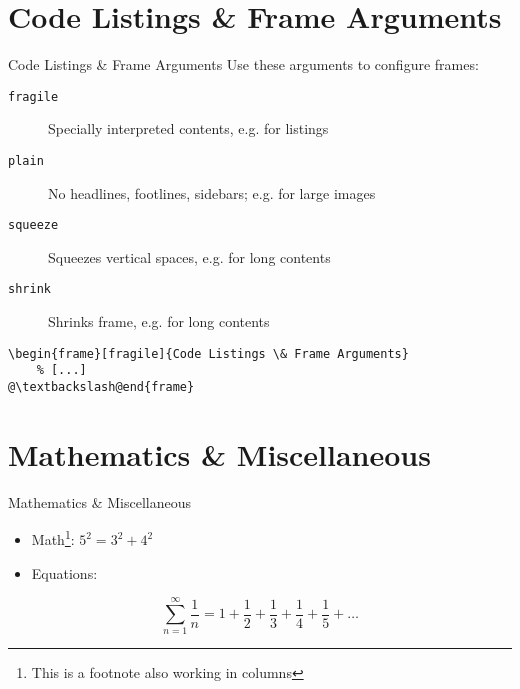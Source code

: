 \documentclass{beamer}
\begin{document}
\section{Code Listings \& Frame Arguments}
\begin{frame}[fragile]{Code Listings \& Frame Arguments}
	Use these arguments to configure frames:
	\begin{description}
		\item[\texttt{fragile}\hfill]
		Specially interpreted contents, e.g. for listings
		\item[\texttt{plain}\hfill]
		No headlines, footlines, sidebars; e.g. for large images\\
		\item[\texttt{squeeze}\hfill]
		Squeezes vertical spaces, e.g. for long contents
		\item[\texttt{shrink}\hfill]
		Shrinks frame, e.g. for long contents
	\end{description}
	\begin{lstlisting}[caption={Frame Options}]
\begin{frame}[fragile]{Code Listings \& Frame Arguments}
	% [...]
@\textbackslash@end{frame}
	\end{lstlisting}
\end{frame}

\section{Mathematics \& Miscellaneous}
\begin{frame}{Mathematics \& Miscellaneous}
	\begin{itemize}
		\item Math\footnote[frame]{This is a footnote also working in columns}: $5^{2}=3^{2}+4^{2}$
		\item Equations:
	\end{itemize}
	\begin{equation}
		\sum_{n = 1}^{\infty} \frac{1}{n} = 1 + \frac{1}{2} + \frac{1}{3} + \frac{1}{4} + \frac{1}{5} + \dots 
	\end{equation}
\end{frame}
\end{document}
